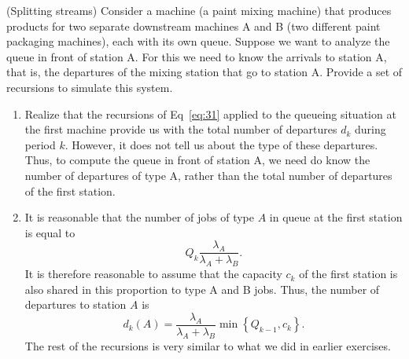 \begin{exercise} (Splitting streams)
  Consider a machine (a paint mixing machine) that produces products
  for two separate downstream machines A and B (two different paint
  packaging machines), each with its own queue.  Suppose we want to
  analyze the queue in front of station A. For this we need to know
  the arrivals to station A, that is, the departures of the mixing
  station that go to station A. Provide a set of recursions to
  simulate this system.
  \begin{solution}
\begin{enumerate}
\item Realize that the recursions of Eq~\eqref{eq:31} applied to the
  queueing situation at the first machine provide us with the total
  number of departures $d_k$ during period $k$. However, it does not
  tell us about the type of these departures. Thus, to compute the
  queue in front of station A, we need do know the number of
  departures of type A, rather than the total number of departures of
  the first station.
\item It is reasonable that the number of jobs of type $A$ in queue at
  the first station is equal to
  \begin{equation*}
  Q_k \frac{\lambda_A}{\lambda_A + \lambda_B}.
  \end{equation*}
  It is therefore reasonable to assume that the capacity $c_k$ of the
  first station is also shared in this proportion to type A and B
  jobs. Thus, the number of departures to station $A$ is
  \begin{equation*}
    d_k(A) = \frac{\lambda_A}{\lambda_A+\lambda_B} \min\left\{ Q_{k-1}, c_k\right\}.
  \end{equation*}
 The rest of the recursions is very similar to what we did in earlier exercises.
\end{enumerate}
  \end{solution}
\end{exercise}



